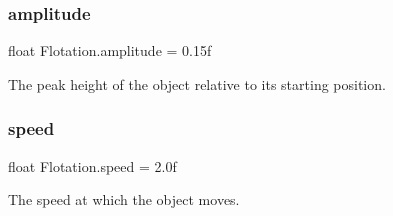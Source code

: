 \subsubsection{\texorpdfstring{amplitude}{amplitude}}
{\footnotesize\ttfamily float Flotation.\+amplitude = 0.\+15f}



The peak height of the object relative to its starting position. 

\mbox{\label{class_flotation_abd82625dad57d098d76b1c3dd58446ab}} 
\subsubsection{\texorpdfstring{speed}{speed}}
{\footnotesize\ttfamily float Flotation.\+speed = 2.\+0f}



The speed at which the object moves. 

